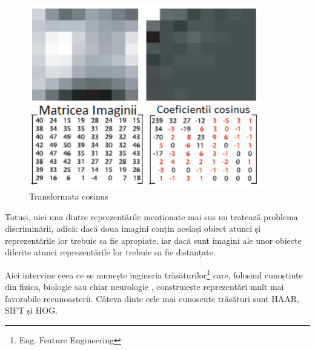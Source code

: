 \begin{figure}[H]
	\centering
		\includegraphics[width=0.90\textwidth]{imagini/take_DCT.png}
	\caption{Transformata cosinus\protect\footnotemark}
	\label{fig:take_DCT}
\end{figure}


Totuși, nici una dintre reprezentările menționate mai sus nu tratează problema discriminării, adică: dacă doua imagini conțin același obiect atunci și reprezentările lor trebuie sa fie apropiate, iar dacă sunt imagini ale unor obiecte diferite atunci reprezentările lor trebuie sa fie distanțate.

Aici intervine ceea ce se numește ingineria trăsăturilor\footnote{Eng. Feature Engineering} care, folosind cunoștințe din fizica, biologie sau chiar neurologie , construiește reprezentări mult mai favorabile recunoașterii.
Câteva dinte cele mai cunoscute trăsături sunt HAAR\cite{Viola01robustreal-time}, SIFT\cite{Lowe99objectrecognition} și HOG\cite{Dalal05histogramsof}.

